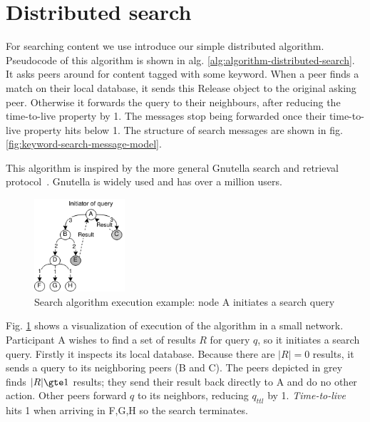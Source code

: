 \section{Distributed search}
For searching content we use introduce our simple distributed algorithm. Pseudocode of this algorithm is shown in alg. \ref{alg:algorithm-distributed-search}. It asks peers around for content tagged with some keyword. When a peer finds a match on their local database, it sends this Release object to the original asking peer. Otherwise it forwards the query to their neighbours, after reducing the time-to-live property by 1. The messages stop being forwarded once their time-to-live property hits below 1. The structure of search messages are shown in fig. \ref{fig:keyword-search-message-model}. 

This algorithm is inspired by the more general Gnutella search and retrieval protocol~\citep{kronfol2002fasd}. Gnutella is widely used and has over a million users.



\begin{figure}
    \centering
    \includegraphics[width=0.3\textwidth]{design/search-algorithm-diagram.png}
    \caption{Search algorithm execution example: node A initiates a search query}
    \label{fig:search-algorithm-diagram}
\end{figure}

Fig. \ref{fig:search-algorithm-diagram} shows a visualization of execution of the algorithm in a small network. Participant A wishes to find a set of results $R$ for query $q$, so it initiates a search query. Firstly it inspects its local database. Because there are $|R|=0$ results, it sends a query to its neighboring peers (B and C). The peers depicted in grey finds $|R|\gte 1$ results; they send their result back directly to A and do no other action. Other peers forward $q$ to its neighbors, reducing $q_{ttl}$ by 1. \textit{Time-to-live} hits 1 when arriving in F,G,H so the search terminates. 

